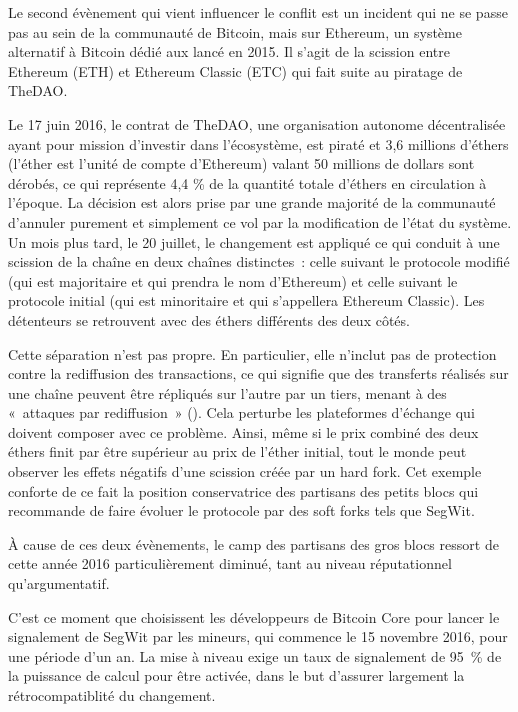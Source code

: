 Le second évènement qui vient influencer le conflit est un incident qui ne se passe pas au sein de la communauté de Bitcoin, mais sur Ethereum, un système alternatif à Bitcoin dédié aux  lancé en 2015. Il s'agit de la scission entre Ethereum (ETH) et Ethereum Classic (ETC) qui fait suite au piratage de TheDAO. %

Le 17 juin 2016, le contrat de TheDAO, une organisation autonome décentralisée ayant pour mission d'investir dans l'écosystème, est piraté et 3,6 millions d'éthers (l'éther est l'unité de compte d'Ethereum) valant 50 millions de dollars sont dérobés, ce qui représente 4,4 \% de la quantité totale d'éthers en circulation à l'époque. La décision est alors prise par une grande majorité de la communauté d'annuler purement et simplement ce vol par la modification de l'état du système. Un mois plus tard, le 20 juillet, le changement est appliqué ce qui conduit à une scission de la chaîne en deux chaînes distinctes~: celle suivant le protocole modifié (qui est majoritaire et qui prendra le nom d'Ethereum) et celle suivant le protocole initial (qui est minoritaire et qui s'appellera Ethereum Classic). Les détenteurs se retrouvent avec des éthers différents des deux côtés.

Cette séparation n'est pas propre. En particulier, elle n'inclut pas de protection contre la rediffusion des transactions, ce qui signifie que des transferts réalisés sur une chaîne peuvent être répliqués sur l'autre par un tiers, menant à des «~attaques par rediffusion~» (). Cela perturbe les plateformes d'échange qui doivent composer avec ce problème. Ainsi, même si le prix combiné des deux éthers finit par être supérieur au prix de l'éther initial, tout le monde peut observer les effets négatifs d'une scission créée par un hard fork. Cet exemple conforte de ce fait la position conservatrice des partisans des petits blocs qui recommande de faire évoluer le protocole par des soft forks tels que SegWit.

À cause de ces deux évènements, le camp des partisans des gros blocs ressort de cette année 2016 particulièrement diminué, tant au niveau réputationnel qu'argumentatif.

C'est ce moment que choisissent les développeurs de Bitcoin Core pour lancer le signalement de SegWit par les mineurs, qui commence le 15 novembre 2016, pour une période d'un an. La mise à niveau exige un taux de signalement de 95~\% de la puissance de calcul pour être activée, dans le but d'assurer largement la rétrocompatiblité du changement.

